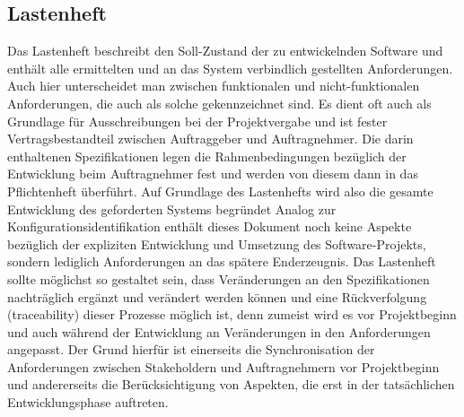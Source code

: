\subsection{Lastenheft}
Das Lastenheft beschreibt den Soll-Zustand der zu entwickelnden Software und enthält alle ermittelten und an das System verbindlich gestellten Anforderungen. Auch hier unterscheidet man zwischen funktionalen und nicht-funktionalen Anforderungen, die auch als solche gekennzeichnet sind. 
Es dient oft auch als Grundlage für Ausschreibungen bei der Projektvergabe und ist fester Vertragsbestandteil zwischen Auftraggeber und Auftragnehmer. Die darin enthaltenen Spezifikationen legen die Rahmenbedingungen bezüglich der Entwicklung beim Auftragnehmer fest und werden von diesem dann in das Pflichtenheft überführt. Auf Grundlage des Lastenhefts wird also die gesamte Entwicklung des geforderten Systems begründet 
Analog zur Konfigurationsidentifikation enthält dieses Dokument noch keine Aspekte bezüglich der expliziten Entwicklung und Umsetzung des Software-Projekts, sondern lediglich Anforderungen an das spätere Enderzeugnis. 
Das Lastenheft sollte möglichst so gestaltet sein, dass Veränderungen an den Spezifikationen nachträglich ergänzt und verändert werden können und eine Rückverfolgung (traceability) dieser Prozesse möglich ist, denn zumeist wird es vor Projektbeginn und auch während der Entwicklung an Veränderungen in den Anforderungen angepasst. Der Grund hierfür ist einerseits die Synchronisation der Anforderungen zwischen Stakeholdern und Auftragnehmern vor Projektbeginn und andererseits die Berücksichtigung von Aspekten, die erst in der tatsächlichen Entwicklungsphase auftreten.
\cite{brd-lastenheft}

